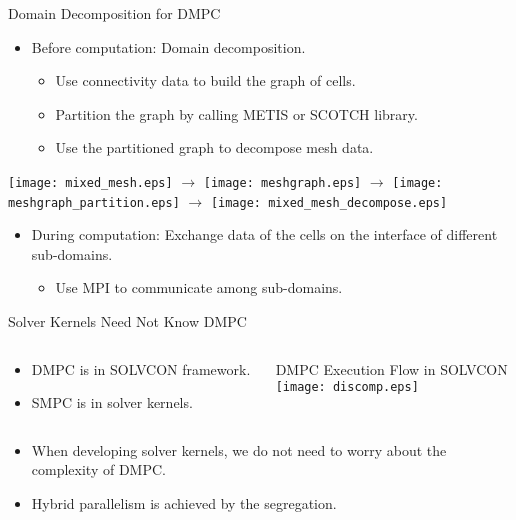 \documentclass[dvips,xcolor=pst,14pt]{beamer}
\begin{document}
\begin{frame}{
%
Domain Decomposition for DMPC
%
}
\begin{itemize}
  \item Before computation: Domain decomposition.
  \begin{itemize}
    \item Use connectivity data to build the graph of cells.
    \item Partition the graph by calling METIS or SCOTCH library.
    \item Use the partitioned graph to decompose mesh data.
  \end{itemize}
\end{itemize}
\begin{center} \scriptsize
  \texttt{[image: mixed\_mesh.eps]}
  $\rightarrow$
  \texttt{[image: meshgraph.eps]}
  $\rightarrow$
  \texttt{[image: meshgraph\_partition.eps]}
  $\rightarrow$
  \texttt{[image: mixed\_mesh\_decompose.eps]}
\end{center}
\begin{itemize}
  \item During computation: Exchange data of the cells on the interface of
  different sub-domains.
  \begin{itemize}
    \item Use MPI to communicate among sub-domains.
  \end{itemize}
\end{itemize}
\end{frame}

\begin{frame}{
%
Solver Kernels Need Not Know DMPC
%
}
\begin{columns}[c]
\begin{column}{.3\textwidth}
\begin{itemize}
  \item DMPC is in SOLVCON framework.
  \item SMPC is in solver kernels.
\end{itemize}
\end{column}
\begin{column}{.7\textwidth} \centering \footnotesize
  DMPC Execution Flow in SOLVCON \\
  \texttt{[image: discomp.eps]}
\end{column}
\end{columns}
\begin{itemize}
  \item When developing solver kernels, we do not need to worry about the
  complexity of DMPC.
  \item Hybrid parallelism is achieved by the segregation.
\end{itemize}
\end{frame}
\end{document}
